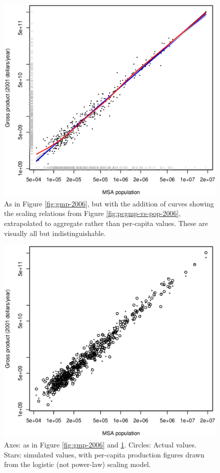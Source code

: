 \documentclass{pnastwo}
\begin{document}
\begin{figure}
\includegraphics[width=\columnwidth]{gmp2006-ols-vs-slope-1}
\caption{As in Figure \ref{fig:gmp-2006}, but with the addition of curves
  showing the scaling relations from Figure \ref{fig:pcgmp-vs-pop-2006},
  extrapolated to aggregate rather than per-capita values.  These are visually
  all but indistinguishable.}
\label{fig:gmp2006-ols-vs-slope-1}
\end{figure}

\begin{figure}
\includegraphics[width=\columnwidth]{gmp-vs-loggrowth-surrogate}
\caption{Axes: as in Figure \ref{fig:gmp-2006} and
  \ref{fig:gmp2006-ols-vs-slope-1}.  Circles: Actual values.  Stars: simulated
  values, with per-capita production figures drawn from the logistic (not
  power-law) scaling model.}
\label{fig:gmp-vs-loggrowth-surrogate}
\end{figure}
\end{document}
